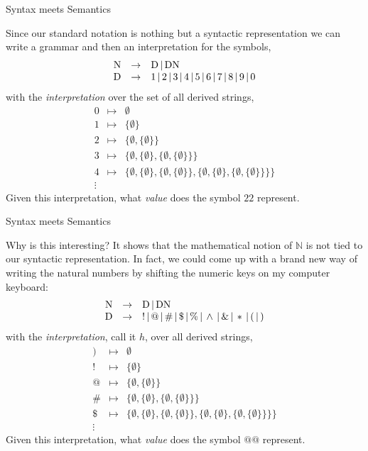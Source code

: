\documentclass{beamer}
\begin{document}
\begin{frame}{Syntax meets Semantics}
\scriptsize

Since our standard notation is nothing but a syntactic representation we can write a grammar and then an interpretation for the symbols,
\[
\begin{array}{rcl}
\mbox{N} &\rightarrow& \mbox{D} \,|\, \mbox{D}\mbox{N}\\
\mbox{D} &\rightarrow& 1 \,|\, 2 \,|\, 3 \,|\, 4 \,|\, 5 \,|\, 6 \,|\, 7 \,|\, 8 \,|\, 9 \,|\, 0
\end{array}
\]
with the {\em interpretation} over the set of all derived strings,
\[
\begin{array}{rcl}
0 & \mapsto & \emptyset \\
1 & \mapsto & \{\emptyset \} \\
2 & \mapsto & \{ \emptyset , \{\emptyset \} \}\\
3 & \mapsto &\{ \emptyset , \{\emptyset \}, \{ \emptyset , \{\emptyset \} \} \}\\
4 & \mapsto & \{ \emptyset , \{\emptyset \}, \{ \emptyset , \{\emptyset \} \} , \{ \emptyset , \{\emptyset \}, \{ \emptyset , \{\emptyset \} \} \}\}\\
\vdots
\end{array}
\]
Given this interpretation, what {\em value} does the symbol $22$ represent.
\end{frame}


\begin{frame}{Syntax meets Semantics}
\scriptsize

Why is this interesting?  It shows that the mathematical notion of $\mathbb{N}$ is not tied to our syntactic representation.
In fact, we could come up with a brand new way of writing the natural numbers by shifting the numeric keys on my computer keyboard:
\[
\begin{array}{rcl}
\mbox{N} &\rightarrow& \mbox{D} \,|\, \mbox{D}\mbox{N}\\
\mbox{D} &\rightarrow& ! \,|\, @ \,|\, \# \,|\, \$ \,|\, \% \,|\, \wedge \,|\, \& \,|\, * \,|\, ( \,|\, )
\end{array}
\]
with the {\em interpretation}, call it $h$, over all derived strings,
\[
\begin{array}{rcl}
) & \mapsto & \emptyset \\
! & \mapsto & \{\emptyset \} \\
@ & \mapsto & \{ \emptyset , \{\emptyset \} \}\\
\# & \mapsto &\{ \emptyset , \{\emptyset \}, \{ \emptyset , \{\emptyset \} \} \}\\
\$ & \mapsto & \{ \emptyset , \{\emptyset \}, \{ \emptyset , \{\emptyset \} \} , \{ \emptyset , \{\emptyset \}, \{ \emptyset , \{\emptyset \} \} \}\}\\
\vdots
\end{array}
\]
Given this interpretation, what {\em value} does the symbol $@@$ represent.
\end{frame}
\end{document}
